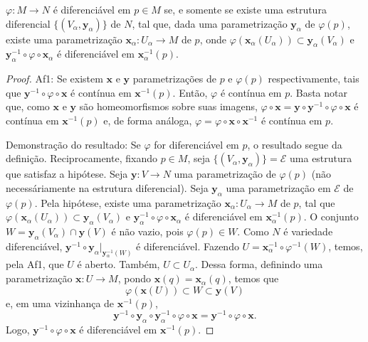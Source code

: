 \begin{proposition}
    \label{loc:!resultados_extras_importantes!.resultado_2}
    $\varphi:M\to N$ é diferenciável em $p \in M$ se, e somente se existe uma estrutura diferencial $\{ (V_{\alpha}, \mathbf{y}_{\alpha}) \}$ de $N$, tal que, dada uma parametrização $\mathbf{y}_{\alpha}$ de $\varphi(p)$, existe uma parametrização $\mathbf{x}_{\alpha}:U_{\alpha}\to M$ de $p$, onde $\varphi(\mathbf{x}_{\alpha}(U_{\alpha}))\subset \mathbf{y}_{\alpha}(V_{\alpha})$ e $\mathbf{y}_{\alpha}^{-1} \circ\varphi \circ \mathbf{x}_{\alpha}$ é diferenciável em $\mathbf{x}_{\alpha}^{-1}(p)$.
    \begin{proof}

        Af1: Se existem $\mathbf{x}$ e $\mathbf{y}$ parametrizações de $p$ e $\varphi(p)$ respectivamente, tais que $\mathbf{y}^{-1} \circ \varphi \circ \mathbf{x}$ é contínua em $\mathbf{x}^{-1}(p)$. Então, $\varphi$ é contínua em $p$.
        Basta notar que, como $\mathbf{x}$ e $\mathbf{y}$ são homeomorfismos sobre suas imagens, $\varphi \circ \mathbf{x}=\mathbf{y}\circ \mathbf{y}^{-1} \circ \varphi \circ \mathbf{x}$ é contínua em $\mathbf{x}^{-1}(p)$ e, de forma análoga, $\varphi=\varphi \circ \mathbf{x} \circ \mathbf{x}^{-1}$ é contínua em $p$.

        Demonstração do resultado:
        Se $\varphi$ for diferenciável em $p$, o resultado segue da definição. Reciprocamente, fixando $p \in M$, seja $\{ (V_{\alpha}, \mathbf{y}_{\alpha}) \}= \mathcal{E}$ uma estrutura que satisfaz a hipótese. Seja $\mathbf{y}:V\to N$ uma parametrização  de $\varphi(p)$ (não necessáriamente na estrutura diferencial).
        Seja $\mathbf{y}_{\alpha}$ uma parametrização em $\mathcal{E}$ de $\varphi(p)$. Pela hipótese, existe uma parametrização $\mathbf{x}_{\alpha}:U_{\alpha}\to M$ de $p$, tal que $\varphi(\mathbf{x}_{\alpha}(U_{\alpha}))\subset \mathbf{y}_{\alpha}(V_{\alpha})$ e $\mathbf{y}_{\alpha}^{-1} \circ \varphi \circ \mathbf{x}_{\alpha}$ é diferenciável em $\mathbf{x}_{\alpha}^{-1}(p)$.
        O conjunto $W=\mathbf{y}_{\alpha}(V_{\alpha})\cap \mathbf{y}(V)$ é não vazio, pois $\varphi(p)\in W$. Como $N$ é variedade diferenciável, $\mathbf{y}^{-1} \circ \mathbf{y}_{\alpha}|_{\mathbf{y}_{\alpha}^{-1}(W)}$ é diferenciável.
        Fazendo $U=\mathbf{x}_{\alpha}^{-1} \circ \varphi ^{-1}(W)$, temos, pela Af1, que $U$ é aberto.
        Também, $U \subset U_{\alpha}$.
        Dessa forma, definindo uma parametrização $\mathbf{x}:U\to M$, pondo $\mathbf{x}(q)=\mathbf{x}_{\alpha}(q)$, temos que
        \begin{equation*}
            \varphi(\mathbf{x}(U))\subset W\subset \mathbf{y}(V)
        \end{equation*}
        e, em uma vizinhança de $\mathbf{x}^{-1}(p)$,
        \begin{equation*}
            \mathbf{y}^{-1} \circ \mathbf{y}_{\alpha} \circ  \mathbf{y}_{\alpha}^{-1} \circ  \varphi \circ  \mathbf{x} =\mathbf{y}^{-1} \circ  \varphi \circ  \mathbf{x}.
        \end{equation*}
        Logo, $\mathbf{y}^{-1} \circ \varphi \circ \mathbf{x}$ é diferenciável em $\mathbf{x}^{-1}(p)$.
    \end{proof}
\end{proposition}
